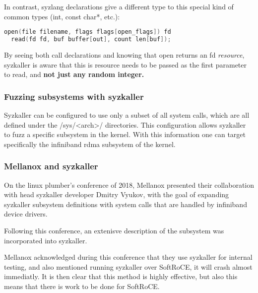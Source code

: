 In contrast, syzlang declarations give a different type to this special kind of common types (int, const char*, etc.):

\begin{lstlisting}[caption={syzlang definitions for open and read}, label={lst:syzlangdefs}, language=c]
  open(file filename, flags flags[open_flags]) fd
  read(fd fd, buf buffer[out], count len[buf]);
\end{lstlisting}

By seeing both call declarations and knowing that open returns an fd \emph{resource}, syzkaller is aware
that this is resource needs to be passed as the first parameter to read, and \textbf{not just any random integer.}

\subsubsection{Fuzzing subsystems with syzkaller}

Syzkaller can be configured to use only a subset of all system calls, which are all defined under
the /sys/<arch>/ directories. This configuration allows syzkaller to fuzz
a specific subsystem in the kernel. With this information one can target specifically
the infiniband rdma subsystem of the kernel.


\subsubsection{Mellanox and syzkaller}

On the linux plumber's conference of 2018, Mellanox presented their collaboration with head syzkaller
developer Dmitry Vyukov, with the goal of expanding syzkaller subsystem definitions with system calls
that are handled by infiniband device drivers\cite{lpc2018}.

Following this conference, an extenisve description of the subsystem was incorporated into syzkaller.

Mellanox acknowledged during this conference that they use syzkaller for internal testing,
and also mentioned running syzkaller over SoftRoCE, it will crash almost immediatly. It is then clear
that this method is highly effective, but also this means that there is work to be done
for SoftRoCE.





